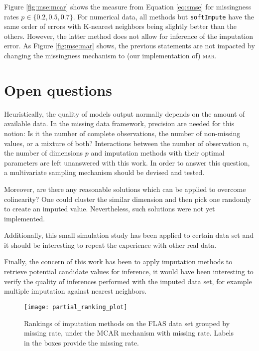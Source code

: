 Figure \ref{fig:mse:mcar} shows the measure from Equation \eqref{eq:smse} for
missingness rates $p \in \{0.2, 0.5, 0.7\}$. For numerical data, all methods
but \texttt{softImpute} have the same order of errors with K-nearest neighbors
being slightly better than the others. However, the latter method does not
allow for inference of the imputation error.  As Figure \ref{fig:mse:mar}
shows, the previous statements are not impacted by changing the missingness
mechanism to (our implementation of) \textsc{mar}.

\section{Open questions}

Heuristically, the quality of models output normally depends on the amount of
available data. In the missing data framework, precision are needed for this
notion: Is it the number of complete observations, the number of non-missing
values, or a mixture of both?  Interactions between the number of observation
$n$, the number of dimensions $p$ and imputation methods with their optimal
parameters are left unanswered with this work. In order to answer this
question, a multivariate sampling mechanism should be devised and tested.

Moreover, are there any reasonable solutions which can be applied to overcome
colinearity? One could cluster the similar dimension and then pick one randomly
to create an imputed value. Nevertheless, such solutions were not yet
implemented.

Additionally, this small simulation study has been applied to certain data set
and it should be interesting to repeat the experience with other real data.

Finally, the concern of this work has been to apply imputation methods to
retrieve potential candidate values for inference, it would have been
interesting to verify the quality of inferences performed with the imputed data
set, for example multiple imputation against nearest neighbors.


\begin{figure}
  \centering
  \texttt{[image: partial\_ranking\_plot]}
  \caption{Rankings of imputation methods on the FLAS data set grouped by
    missing rate, under the MCAR mechanism with missing rate. Labels in the
    boxes provide the missing rate.}
  \label{fig:ranking:imputations}
\end{figure}


